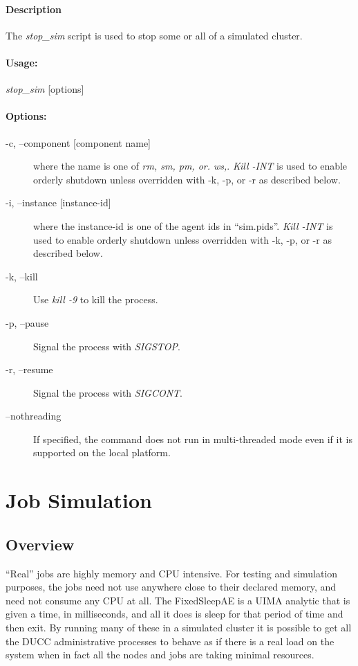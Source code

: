     \paragraph{Description}
    The {\em stop\_sim} script is used to stop some or all of a simulated cluster.
    
    \paragraph{Usage:}
    {\em stop\_sim} [options]

    \paragraph{Options:}
    \begin{description}
      \item[-c, --component {[component name]}] where the name is one of {\em
        rm, sm, pm, or. ws,}.  {\em Kill -INT} is used to enable orderly shutdown
      unless overridden with -k, -p, or -r as described below.
      \item[-i, --instance {[instance-id]}] where the instance-id is one of the
        agent ids in ``sim.pids''. {\em Kill -INT} is used to enable orderly shutdown
      unless overridden with -k, -p, or -r as described below.
      \item[-k, --kill] Use {\em kill -9} to kill the process.
      \item[-p, --pause] Signal the process with {\em SIGSTOP}.
      \item[-r, --resume] Signal the process with {\em SIGCONT}.
      \item[--nothreading] If specified, the command does not run in multi-threaded mode
        even if it is supported on the local platform.

    \end{description}
    
\section{Job Simulation}

    \subsection{Overview}
     ``Real'' jobs are highly memory and CPU intensive.  For testing and simulation
     purposes, the jobs need not use anywhere close to their declared memory, and
     need not consume any CPU at all.  The FixedSleepAE is a UIMA analytic that
     is given a time, in milliseconds, and all it does is sleep for that period
     of time and then exit.  By running many of these in a simulated cluster
     it is possible to get all the DUCC administrative processes to behave 
     as if there is a real load on the system when in fact all the nodes and
     jobs are taking minimal resources.

